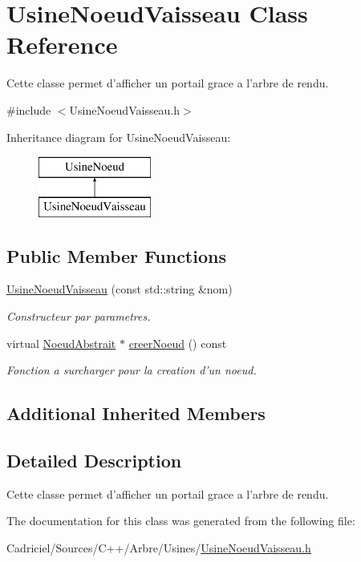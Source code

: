 \hypertarget{class_usine_noeud_vaisseau}{\section{Usine\-Noeud\-Vaisseau Class Reference}
\label{class_usine_noeud_vaisseau}
}


Cette classe permet d'afficher un portail grace a l'arbre de rendu.  




{\ttfamily \#include $<$Usine\-Noeud\-Vaisseau.\-h$>$}

Inheritance diagram for Usine\-Noeud\-Vaisseau\-:\begin{figure}[H]
\begin{center}
\leavevmode
\includegraphics[height=2.000000cm]{class_usine_noeud_vaisseau}
\end{center}
\end{figure}
\subsection*{Public Member Functions}
\begin{DoxyCompactItemize}
\item 
\hyperlink{group__inf2990_ga45efed55da2886bd5f555d2564bed0b0}{Usine\-Noeud\-Vaisseau} (const std\-::string \&nom)
\begin{DoxyCompactList}\small\item\em Constructeur par parametres. \end{DoxyCompactList}\item 
virtual \hyperlink{class_noeud_abstrait}{Noeud\-Abstrait} $\ast$ \hyperlink{group__inf2990_ga90b6c05544585681ba62e468ad958dae}{creer\-Noeud} () const 
\begin{DoxyCompactList}\small\item\em Fonction a surcharger pour la creation d'un noeud. \end{DoxyCompactList}\end{DoxyCompactItemize}
\subsection*{Additional Inherited Members}


\subsection{Detailed Description}
Cette classe permet d'afficher un portail grace a l'arbre de rendu. 

The documentation for this class was generated from the following file\-:\begin{DoxyCompactItemize}
\item 
Cadriciel/\-Sources/\-C++/\-Arbre/\-Usines/\hyperlink{_usine_noeud_vaisseau_8h}{Usine\-Noeud\-Vaisseau.\-h}\end{DoxyCompactItemize}

